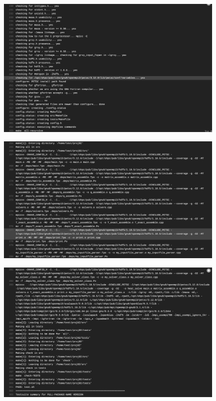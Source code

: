 \documentclass[12 pt, final]{article}
\begin{document}
\begin{itemize}
\begin{figure}[H]
        \label{fig:travis}
        \end{figure}
                  \begin{figure}[H]
        \centering
          \includegraphics[width=.99\linewidth]{figures/travis3.png}

        \label{fig:travis}
        \end{figure}
                  \begin{figure}[H]
        \centering
          \includegraphics[width=.99\linewidth]{figures/travis4.png}

        \label{fig:travis}
        \end{figure}
                  \begin{figure}[H]
        \centering
          \includegraphics[width=.99\linewidth]{figures/travis5.png}


\end{figure}
\end{itemize}
\end{document}

